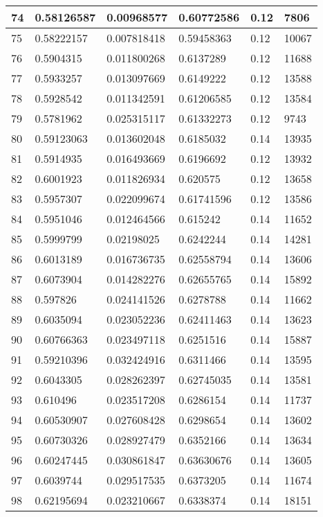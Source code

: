 \begin{longtable}{|l|l|l|l|l|l|}
74 & 0.58126587 & 0.00968577 & 0.60772586 & 0.12 & 7806 \\ \hline 
75 & 0.58222157 & 0.007818418 & 0.59458363 & 0.12 & 10067 \\ \hline 
76 & 0.5904315 & 0.011800268 & 0.6137289 & 0.12 & 11688 \\ \hline 
77 & 0.5933257 & 0.013097669 & 0.6149222 & 0.12 & 13588 \\ \hline 
78 & 0.5928542 & 0.011342591 & 0.61206585 & 0.12 & 13584 \\ \hline 
79 & 0.5781962 & 0.025315117 & 0.61332273 & 0.12 & 9743 \\ \hline 
80 & 0.59123063 & 0.013602048 & 0.6185032 & 0.14 & 13935 \\ \hline 
81 & 0.5914935 & 0.016493669 & 0.6196692 & 0.12 & 13932 \\ \hline 
82 & 0.6001923 & 0.011826934 & 0.620575 & 0.12 & 13658 \\ \hline 
83 & 0.5957307 & 0.022099674 & 0.61741596 & 0.12 & 13586 \\ \hline 
84 & 0.5951046 & 0.012464566 & 0.615242 & 0.14 & 11652 \\ \hline 
85 & 0.5999799 & 0.02198025 & 0.6242244 & 0.14 & 14281 \\ \hline 
86 & 0.6013189 & 0.016736735 & 0.62558794 & 0.14 & 13606 \\ \hline 
87 & 0.6073904 & 0.014282276 & 0.62655765 & 0.14 & 15892 \\ \hline 
88 & 0.597826 & 0.024141526 & 0.6278788 & 0.14 & 11662 \\ \hline 
89 & 0.6035094 & 0.023052236 & 0.62411463 & 0.14 & 13623 \\ \hline 
90 & 0.60766363 & 0.023497118 & 0.6251516 & 0.14 & 15887 \\ \hline 
91 & 0.59210396 & 0.032424916 & 0.6311466 & 0.14 & 13595 \\ \hline 
92 & 0.6043305 & 0.028262397 & 0.62745035 & 0.14 & 13581 \\ \hline 
93 & 0.610496 & 0.023517208 & 0.6286154 & 0.14 & 11737 \\ \hline 
94 & 0.60530907 & 0.027608428 & 0.6298654 & 0.14 & 13602 \\ \hline 
95 & 0.60730326 & 0.028927479 & 0.6352166 & 0.14 & 13634 \\ \hline 
96 & 0.60247445 & 0.030861847 & 0.63630676 & 0.14 & 13605 \\ \hline 
97 & 0.6039744 & 0.029517535 & 0.6373205 & 0.14 & 11674 \\ \hline 
98 & 0.62195694 & 0.023210667 & 0.6338374 & 0.14 & 18151 \\ \hline 

\end{longtable}
